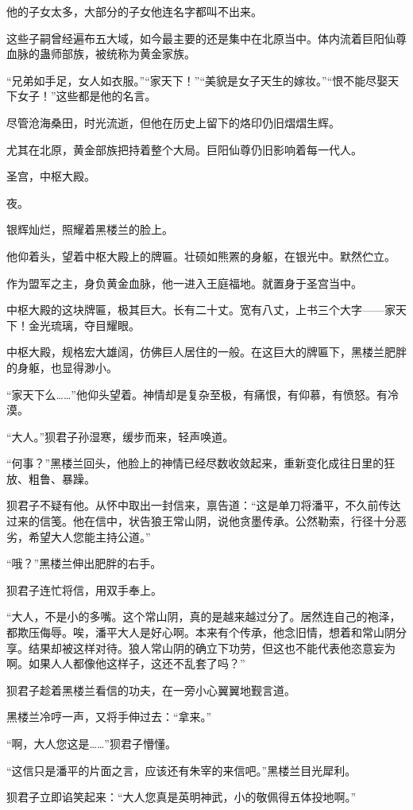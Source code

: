 \begin{this_body}
他的子女太多，大部分的子女他连名字都叫不出来。

这些子嗣曾经遍布五大域，如今最主要的还是集中在北原当中。体内流着巨阳仙尊血脉的蛊师部族，被统称为黄金家族。

“兄弟如手足，女人如衣服。”“家天下！”“美貌是女子天生的嫁妆。”“恨不能尽娶天下女子！”这些都是他的名言。

尽管沧海桑田，时光流逝，但他在历史上留下的烙印仍旧熠熠生辉。

尤其在北原，黄金部族把持着整个大局。巨阳仙尊仍旧影响着每一代人。

圣宫，中枢大殿。

夜。

银辉灿烂，照耀着黑楼兰的脸上。

他仰着头，望着中枢大殿上的牌匾。壮硕如熊罴的身躯，在银光中。默然伫立。

作为盟军之主，身负黄金血脉，他一进入王庭福地。就置身于圣宫当中。

中枢大殿的这块牌匾，极其巨大。长有二十丈。宽有八丈，上书三个大字——家天下！金光琉璃，夺目耀眼。

中枢大殿，规格宏大雄阔，仿佛巨人居住的一般。在这巨大的牌匾下，黑楼兰肥胖的身躯，也显得渺小。

“家天下么……”他仰头望着。神情却是复杂至极，有痛恨，有仰慕，有愤怒。有冷漠。

“大人。”狈君子孙湿寒，缓步而来，轻声唤道。

“何事？”黑楼兰回头，他脸上的神情已经尽数收敛起来，重新变化成往日里的狂放、粗鲁、暴躁。

狈君子不疑有他。从怀中取出一封信来，禀告道：“这是单刀将潘平，不久前传达过来的信笺。他在信中，状告狼王常山阴，说他贪墨传承。公然勒索，行径十分恶劣，希望大人您能主持公道。”

“哦？”黑楼兰伸出肥胖的右手。

狈君子连忙将信，用双手奉上。

“大人，不是小的多嘴。这个常山阴，真的是越来越过分了。居然连自己的袍泽，都欺压侮辱。唉，潘平大人是好心啊。本来有个传承，他念旧情，想着和常山阴分享。结果却被这样对待。狼人常山阴的确立下功劳，但这也不能代表他恣意妄为啊。如果人人都像他这样子，这还不乱套了吗？”

狈君子趁着黑楼兰看信的功夫，在一旁小心翼翼地觐言道。

黑楼兰冷哼一声，又将手伸过去：“拿来。”

“啊，大人您这是……”狈君子懵懂。

“这信只是潘平的片面之言，应该还有朱宰的来信吧。”黑楼兰目光犀利。

狈君子立即谄笑起来：“大人您真是英明神武，小的敬佩得五体投地啊。”


\end{this_body}
